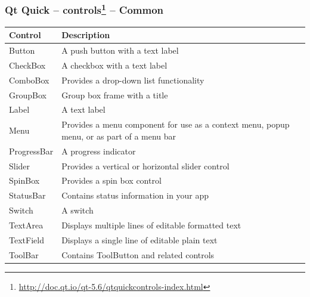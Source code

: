 \begin{frame}
  \frametitle{Qt Quick -- controls\footnote
    {\url{http://doc.qt.io/qt-5.6/qtquickcontrols-index.html}} -- Common}
  \footnotesize
  \begin{tabular}{|p{}|p{}|}
        \hline
        \textbf{Control} & \textbf{Description} \\
        \hline
        Button & A push button with a text label \\
        \hline
        CheckBox & A checkbox with a text label \\
        \hline
        ComboBox & Provides a drop-down list functionality \\
        \hline
        GroupBox & Group box frame with a title \\
        \hline
        Label & A text label \\
        \hline
        Menu & Provides a menu component for use as a context menu, popup menu,
          or as part of a menu bar \\
        \hline
        ProgressBar & A progress indicator \\
        \hline
        Slider & Provides a vertical or horizontal slider control \\
        \hline
        SpinBox & Provides a spin box control \\
        \hline
        StatusBar & Contains status information in your app \\
        \hline
        Switch & A switch \\
        \hline
	TextArea & Displays multiple lines of editable formatted text \\
        \hline
	TextField & Displays a single line of editable plain text \\
        \hline
	ToolBar & Contains ToolButton and related controls \\
        \hline
  \end{tabular}
\end{frame}


